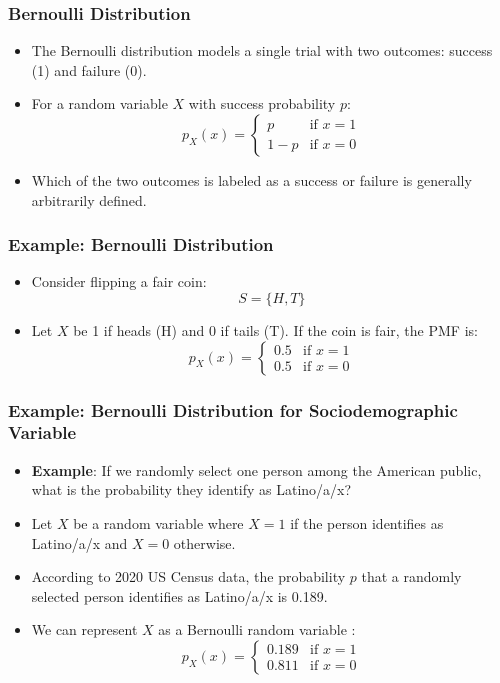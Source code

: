 \documentclass[handout]{beamer} %
\begin{document}
\begin{frame}
\frametitle{Bernoulli Distribution}
    \begin{itemize}
        \item The Bernoulli distribution models a single trial with two outcomes: success (1) and failure (0). \pause
        \item For a random variable \( X \) with success probability \( p \): \pause
        \[
        p_X(x) = \begin{cases}
        p & \text{if } x = 1 \\
        1 - p & \text{if } x = 0
        \end{cases}
        \] \pause
        \item Which of the two outcomes is labeled as a success or failure is generally arbitrarily defined.
    \end{itemize}
\end{frame}

\begin{frame}
\frametitle{Example: Bernoulli Distribution}
    \begin{itemize}
        \item Consider flipping a fair coin: \pause
        \[
        S = \{H, T\}
        \] \pause
        \item Let \( X \) be 1 if heads (H) and 0 if tails (T). If the coin is fair, the PMF is: \pause
        \[
        p_X(x) = \begin{cases}
        0.5 & \text{if } x = 1 \\
        0.5 & \text{if } x = 0
        \end{cases}
        \]
    \end{itemize}
\end{frame}


\begin{frame}
\frametitle{Example: Bernoulli Distribution for Sociodemographic Variable}
    \begin{itemize}
        \item \textbf{Example}: If we randomly select one person among the American public, what is the probability they identify as Latino/a/x? \pause
        \item Let \( X \) be a random variable where \( X = 1 \) if the person identifies as Latino/a/x and \( X = 0 \) otherwise. \pause
        \item According to 2020 US Census data, the probability \( p \) that a randomly selected person identifies as Latino/a/x is 0.189. \pause
        \item We can represent $X$ as a Bernoulli random variable : \pause
        \[
        p_X(x) = \begin{cases}
        0.189 & \text{if } x = 1 \\
        0.811 & \text{if } x = 0
        \end{cases}
        \] \pause
    \end{itemize}
\end{frame}
\end{document}
